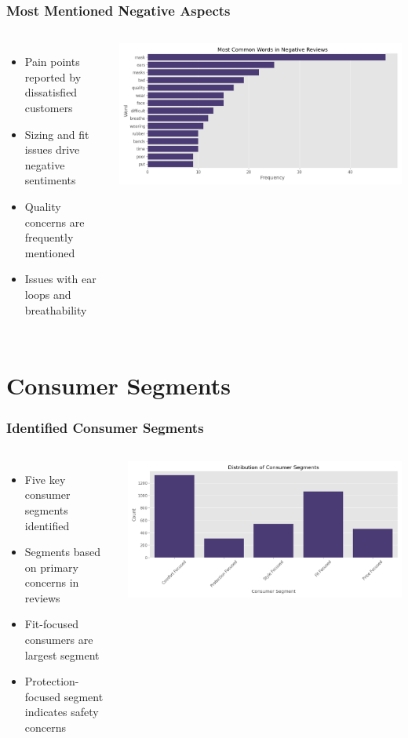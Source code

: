 \documentclass[aspectratio=169]{beamer}
\begin{document}
\begin{frame}
\frametitle{Most Mentioned Negative Aspects}
\begin{columns}
\begin{itemize}
    \item Pain points reported by dissatisfied customers
    \item Sizing and fit issues drive negative sentiments
    \item Quality concerns are frequently mentioned
    \item Issues with ear loops and breathability
\end{itemize}
\includegraphics[width=\textwidth]{plots/common_negative_aspects.png}
\end{columns}
\end{frame}

\section{Consumer Segments}

\begin{frame}
\frametitle{Identified Consumer Segments}
\begin{columns}
\begin{itemize}
    \item Five key consumer segments identified
    \item Segments based on primary concerns in reviews
    \item Fit-focused consumers are largest segment
    \item Protection-focused segment indicates safety concerns
\end{itemize}
\includegraphics[width=\textwidth]{plots/consumer_segments.png}
\end{columns}
\end{frame}
\end{document}
